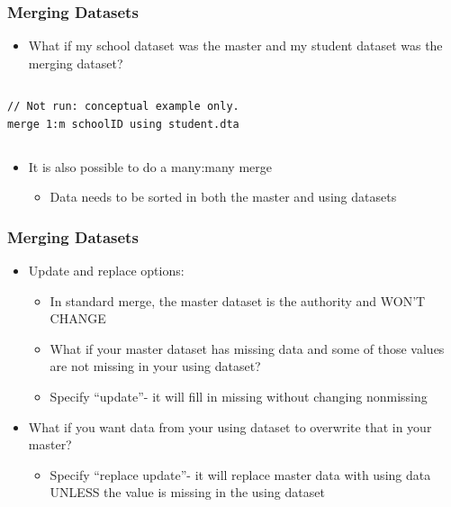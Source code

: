 \documentclass[table]{beamer}
\begin{document}
\begin{frame}[fragile]
\frametitle{Merging Datasets}
\label{sec-6-6}

\begin{itemize}
\item What if my school dataset was the master and
  my student dataset was the merging dataset?
\end{itemize}

\vspace{-.5em} \begin{columns}  \begin{block}{}

\begin{verbatim}
// Not run: conceptual example only.
merge 1:m schoolID using student.dta
\end{verbatim}
\end{block} \end{columns}
\begin{itemize}
\item It is also possible to do a many:many merge
\begin{itemize}
\item Data needs to be sorted in both the master and using datasets
\end{itemize}
\end{itemize}
\end{frame}
\begin{frame}
\frametitle{Merging Datasets}
\label{sec-6-7}

\begin{itemize}
\item Update and replace options:
\begin{itemize}
\item In standard merge, the master dataset is the
      authority and WON'T CHANGE
\item What if your master dataset has missing data and
     some of those values are not missing in your using
     dataset?
\item Specify ``update''- it will fill in missing without
     changing nonmissing
\end{itemize}
\item What if you want data from your using dataset to
    overwrite that in your master?
\begin{itemize}
\item Specify ``replace update''- it will replace master data
     with using data UNLESS the value is missing in the using
     dataset
\end{itemize}
\end{itemize}
\end{frame}
\end{document}
